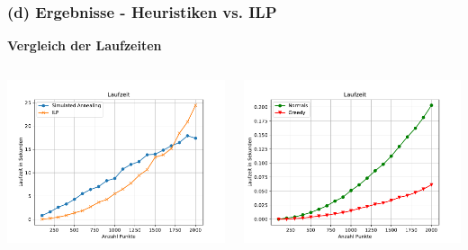 \documentclass[aspectratio=169]{beamer}
\begin{document}


\begin{frame}
	\frametitle{(d) Ergebnisse - Heuristiken vs. ILP}
	\textbf{Vergleich der Laufzeiten}
	\begin{columns}[c] %
	
	\includegraphics[scale=.45]{laufzeit_sa_ilp.pdf}
	
	\includegraphics[scale=.45]{laufzeit_normals_greedy.pdf}
	
	

	\end{columns}

	\end{frame}
\end{document}
